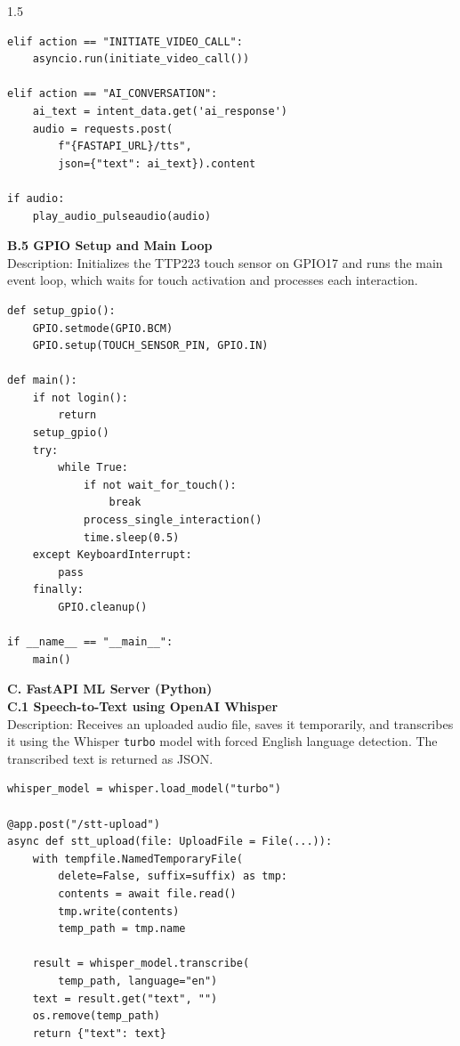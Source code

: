 \begin{spacing}{1.5}
\begin{verbatim}
elif action == "INITIATE_VIDEO_CALL":
    asyncio.run(initiate_video_call())

elif action == "AI_CONVERSATION":
    ai_text = intent_data.get('ai_response')
    audio = requests.post(
        f"{FASTAPI_URL}/tts",
        json={"text": ai_text}).content

if audio:
    play_audio_pulseaudio(audio)
\end{verbatim}

\noindent \textbf{B.5 GPIO Setup and Main Loop}\\
Description: Initializes the TTP223 touch sensor on GPIO17 and runs the main event loop, which waits for touch activation and processes each interaction.
\begin{verbatim}
def setup_gpio():
    GPIO.setmode(GPIO.BCM)
    GPIO.setup(TOUCH_SENSOR_PIN, GPIO.IN)

def main():
    if not login():
        return
    setup_gpio()
    try:
        while True:
            if not wait_for_touch():
                break
            process_single_interaction()
            time.sleep(0.5)
    except KeyboardInterrupt:
        pass
    finally:
        GPIO.cleanup()

if __name__ == "__main__":
    main()
\end{verbatim}


\noindent \textbf{C. FastAPI ML Server (Python)}\\

\noindent \textbf{C.1 Speech-to-Text using OpenAI Whisper}\\
Description: Receives an uploaded audio file, saves it temporarily, and transcribes it using the Whisper \texttt{turbo} model with forced English language detection. The transcribed text is returned as JSON.
\begin{verbatim}
whisper_model = whisper.load_model("turbo")

@app.post("/stt-upload")
async def stt_upload(file: UploadFile = File(...)):
    with tempfile.NamedTemporaryFile(
        delete=False, suffix=suffix) as tmp:
        contents = await file.read()
        tmp.write(contents)
        temp_path = tmp.name

    result = whisper_model.transcribe(
        temp_path, language="en")
    text = result.get("text", "")
    os.remove(temp_path)
    return {"text": text}
\end{verbatim}


\end{spacing}
